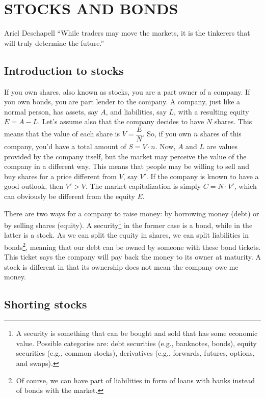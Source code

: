 \chapter{STOCKS AND BONDS}
\begin{chapquote}{Ariel Deschapell}
``While traders may move the markets, it is the tinkerers that will truly determine the future.''
\end{chapquote}

\section{Introduction to stocks} \label{Introduction to stocks}

If you own shares, also known as stocks, you are a part owner of a company. If you own bonds, you are part lender to the company. A company, just like a normal person, has assets, say $A$, and liabilities, say $L$, with a resulting equity $E = A - L$. Let's assume also that the company decides to have $N$ shares. This means that the value of each share is $V = \dfrac{E}{N}$. So, if you own $n$ shares of this company, you'd have a total amount of $S = V \cdot n$. Now, $A$ and $L$ are values provided by the company itself, but the market may perceive the value of the company in a different way. This means that people may be willing to sell and buy shares for a price different from $V$, say $V'$. If the company is known to have a good outlook, then $V' > V$. The market capitalization is simply $C = N \cdot V'$, which can obviously be different from the equity $E$.

There are two ways for a company to raise money: by borrowing money (debt) or by selling shares (equity). A security\footnote{A security is something that can be bought and sold that has some economic value. Possible categories are: debt securities (e.g., banknotes, bonds), equity securities (e.g., common stocks), derivatives (e.g., forwards, futures, options, and swaps).} in the former case is a bond, while in the latter is a stock. As we can split the equity in shares, we can split liabilities in bonds\footnote{Of course, we can have part of liabilities in form of loans with banks instead of bonds with the market.}, meaning that our debt can be owned by someone with these bond tickets. This ticket says the company will pay back the money to its owner at maturity. A stock is different in that its ownership does not mean the company owe me money.

\section{Shorting stocks}

